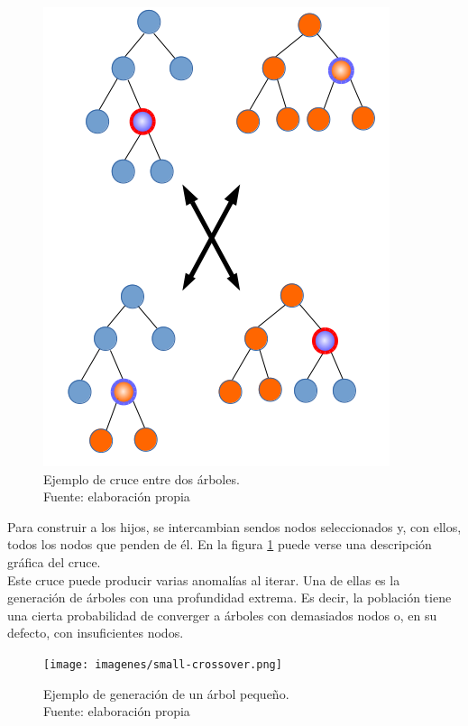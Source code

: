      	\begin{figure}[H]
    		\centering
    		\includegraphics[scale=0.6]{imagenes/crossover.png}
    	    \caption[Ejemplo de cruce entre dos \'arboles]{Ejemplo de cruce entre dos \'arboles.\\ Fuente: elaboraci\'on propia}
    		\label{fig:crossover}
	   \end{figure}

Para construir a los hijos, se intercambian sendos nodos seleccionados y, con ellos, todos los nodos que penden de \'el. En la figura \ref{fig:crossover} puede verse una descripci\'on gr\'afica del cruce.\\

Este cruce puede producir varias anomal\'ias al iterar. Una de ellas es la generaci\'on de \'arboles con una profundidad extrema. Es decir, la poblaci\'on tiene una cierta probabilidad de converger a \'arboles con demasiados nodos o, en su defecto, con insuficientes nodos.\\


     	\begin{figure}[H]
     		\centering
     		\texttt{[image: imagenes/small-crossover.png]}
     		\caption[Ejemplo de generaci\'on de un \'arbol peque\~no]{Ejemplo de generaci\'on de un \'arbol peque\~no.\\ Fuente: elaboraci\'on propia}
     		\label{fig:small_crossover}
     	\end{figure}



